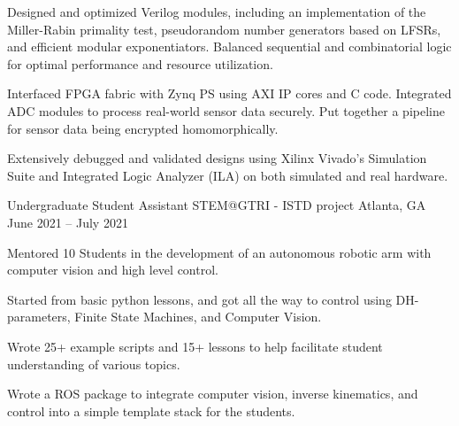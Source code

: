 \documentclass[]{awesome-cv}
\begin{document}
\begin{cventries}
{\begin{cvitems}
        \item {Designed and optimized Verilog modules, including an implementation of the Miller-Rabin primality test, pseudorandom number generators based on LFSRs, and efficient modular exponentiators. Balanced sequential and combinatorial logic for optimal performance and resource utilization.}
        \item {Interfaced FPGA fabric with Zynq PS using AXI IP cores and C code. Integrated ADC modules to process real-world sensor data securely. Put together a pipeline for sensor data being encrypted homomorphically.}
        \item {Extensively debugged and validated designs using Xilinx Vivado's Simulation Suite and Integrated Logic Analyzer (ILA) on both simulated and real hardware.}
    \end{cvitems}}
	\cventry 
	{Undergraduate Student Assistant}
	{STEM@GTRI - ISTD project}
	{Atlanta, GA}
	{June 2021 – July 2021}
	{\begin{cvitems}
	    \item {Mentored 10 Students in the development of an autonomous robotic arm with computer vision and high level control.}
	    \item {Started from basic python lessons, and got all the way to control using DH-parameters, Finite State Machines, and Computer Vision.}
	    \item {Wrote 25+ example scripts and 15+ lessons to help facilitate student understanding of various topics.}
	    \item {Wrote a ROS package to integrate computer vision, inverse kinematics, and control into a simple template stack for the students.}
		\end{cvitems}}

\end{cventries}
\end{document}
